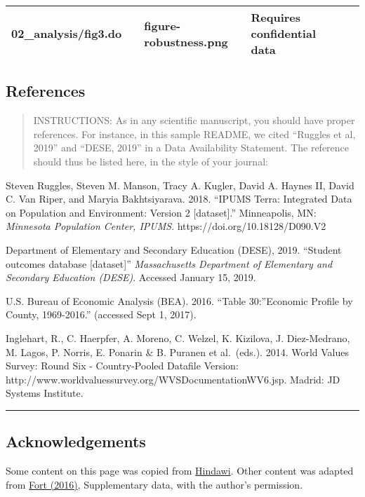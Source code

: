 \documentclass[
]{article}
\begin{document}
\begin{longtable}[]{@{}lllll@{}}
\begin{minipage}[t]{0.18\columnwidth}
02\_analysis/fig3.do\strut
\end{minipage} & \begin{minipage}[t]{0.09\columnwidth}\raggedright
\strut
\end{minipage} & \begin{minipage}[t]{0.23\columnwidth}\raggedright
figure-robustness.png\strut
\end{minipage} & \begin{minipage}[t]{0.23\columnwidth}\raggedright
Requires confidential data\strut
\end{minipage}\tabularnewline
\bottomrule
\end{longtable}

\hypertarget{references}{%
\subsection{References}\label{references}}

\begin{quote}
INSTRUCTIONS: As in any scientific manuscript, you should have proper
references. For instance, in this sample README, we cited ``Ruggles et
al, 2019'' and ``DESE, 2019'' in a Data Availability Statement. The
reference should thus be listed here, in the style of your journal:
\end{quote}

Steven Ruggles, Steven M. Manson, Tracy A. Kugler, David A. Haynes II,
David C. Van Riper, and Maryia Bakhtsiyarava. 2018. ``IPUMS Terra:
Integrated Data on Population and Environment: Version 2
{[}dataset{]}.'' Minneapolis, MN: \emph{Minnesota Population Center,
IPUMS}. https://doi.org/10.18128/D090.V2

Department of Elementary and Secondary Education (DESE), 2019. ``Student
outcomes database {[}dataset{]}'' \emph{Massachusetts Department of
Elementary and Secondary Education (DESE)}. Accessed January 15, 2019.

U.S. Bureau of Economic Analysis (BEA). 2016. ``Table 30:''Economic
Profile by County, 1969-2016.'' (accessed Sept 1, 2017).

Inglehart, R., C. Haerpfer, A. Moreno, C. Welzel, K. Kizilova, J.
Diez-Medrano, M. Lagos, P. Norris, E. Ponarin \& B. Puranen et
al.~(eds.). 2014. World Values Survey: Round Six - Country-Pooled
Datafile Version:
http://www.worldvaluessurvey.org/WVSDocumentationWV6.jsp. Madrid: JD
Systems Institute.

\begin{center}\rule{0.5\linewidth}{0.5pt}\end{center}

\hypertarget{acknowledgements}{%
\subsection{Acknowledgements}\label{acknowledgements}}

Some content on this page was copied from
\href{https://www.hindawi.com/research.data/\#statement.templates}{Hindawi}.
Other content was adapted from
\href{https://doi.org/10.1093/restud/rdw057}{Fort (2016)}, Supplementary
data, with the author's permission.
\end{document}
